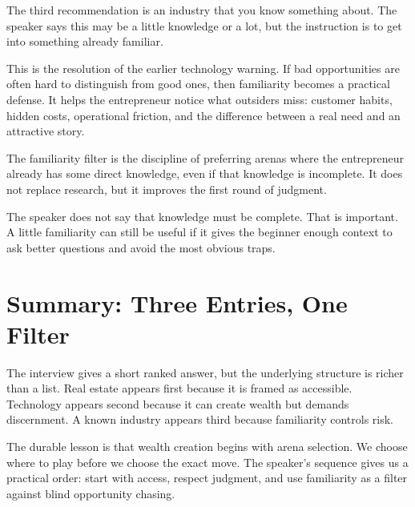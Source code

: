 The third recommendation is an industry that you know something about. The speaker says this may be a little knowledge or a lot, but the instruction is to get into something already familiar.

This is the resolution of the earlier technology warning. If bad opportunities are often hard to distinguish from good ones, then familiarity becomes a practical defense. It helps the entrepreneur notice what outsiders miss: customer habits, hidden costs, operational friction, and the difference between a real need and an attractive story.

\begin{definition}
The familiarity filter is the discipline of preferring arenas where the entrepreneur already has some direct knowledge, even if that knowledge is incomplete. It does not replace research, but it improves the first round of judgment.
\end{definition}

The speaker does not say that knowledge must be complete. That is important. A little familiarity can still be useful if it gives the beginner enough context to ask better questions and avoid the most obvious traps.

\section{Summary: Three Entries, One Filter}

The interview gives a short ranked answer, but the underlying structure is richer than a list. Real estate appears first because it is framed as accessible. Technology appears second because it can create wealth but demands discernment. A known industry appears third because familiarity controls risk.

The durable lesson is that wealth creation begins with arena selection. We choose where to play before we choose the exact move. The speaker's sequence gives us a practical order: start with access, respect judgment, and use familiarity as a filter against blind opportunity chasing.